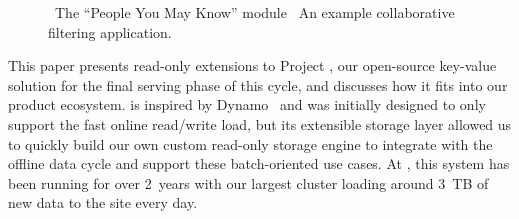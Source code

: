 \begin{figure}
\centering
{}


\caption{~The ``People You May Know'' module
~An example collaborative filtering
application.}
\end{figure}

This paper presents read-only extensions to Project \projectname{},
our open-source key-value solution for the final serving phase of this cycle, and
discusses how it fits into our product ecosystem. \projectname{} is
inspired by Dynamo~\cite{dynamo} and was initially designed to only
support the fast online read/write load, but its extensible storage
layer allowed us to quickly build our own custom read-only storage
engine to integrate with the offline data cycle and support these
batch-oriented use cases. At \linkedin, this system has been running
for over 2~years with our largest cluster loading around 3~TB of new
data to the site every day. 

